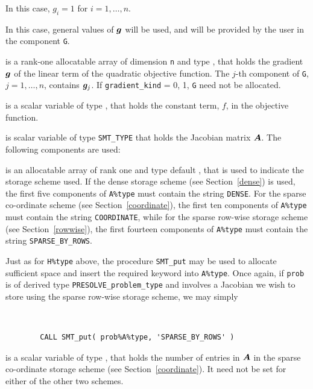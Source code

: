 \documentclass{galahad}
\newcommand{\packagename}{PRESOLVE}
\begin{document}
\begin{description}
\begin{description}
 In this case, $g_{i} = 1$ for $i = 1, \ldots ,n$.

 In this case, general values of ${\bm{g}}$ will be used,
     and will be provided by the user in the component {\tt G}.
\end{description}

 is a rank-one allocatable array of dimension {\tt n} and type
\realdp, that holds the gradient ${\bm{g}}$
of the linear term of the quadratic objective function.
The $j$-th component of {\tt G}, $j = 1,  \ldots ,  n$, contains ${\bm{g}}_{j}$.
If {\tt gradient\_kind} {= 0, 1}, {\tt G} need not be allocated.

 is a scalar variable of type
\realdp, that holds
the constant term, $f$, in the objective function.

 is scalar variable of type {\tt SMT\_TYPE}
that holds the Jacobian matrix ${\bm{A}}$. The following components are used:

\begin{description}

 is an allocatable array of rank one and type default \character, that
is used to indicate the storage scheme used. If the dense storage scheme
(see Section~\ref{dense}) is used,
the first five components of {\tt A\%type} must contain the
string {\tt DENSE}.
For the sparse co-ordinate scheme (see Section~\ref{coordinate}),
the first ten components of {\tt A\%type} must contain the
string {\tt COORDINATE}, while
for the sparse row-wise storage scheme (see Section~\ref{rowwise}),
the first fourteen components of {\tt A\%type} must contain the
string {\tt SPARSE\_BY\_ROWS}.

Just as for {\tt H\%type} above, the procedure {\tt SMT\_put}
may be used to allocate sufficient space and insert the required keyword
into {\tt A\%type}.
Once again, if {\tt prob} is of derived type {\tt \packagename\_problem\_type}
and involves a Jacobian we wish to store using the sparse row-wise
storage scheme, we may simply
{\tt
\begin{verbatim}
        CALL SMT_put( prob%A%type, 'SPARSE_BY_ROWS' )
\end{verbatim}
}
\noindent

 is a scalar variable of type \integer, that
holds the number of entries in ${\bm{A}}$
in the sparse co-ordinate storage scheme (see Section~\ref{coordinate}).
It need not be set for either of the other two schemes.


\end{description}
\end{description}
\end{document}
